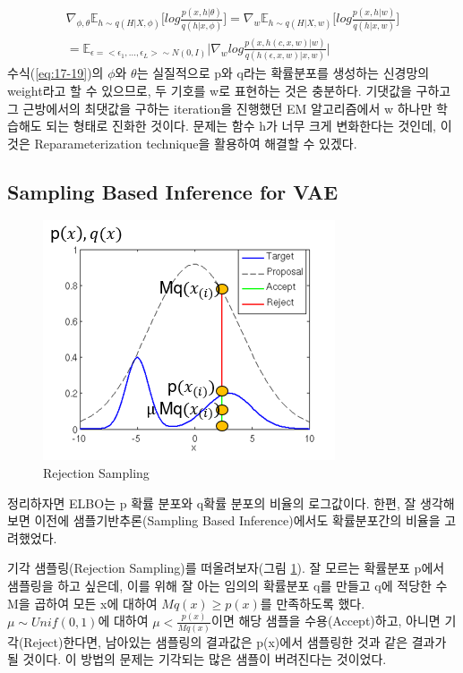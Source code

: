 \documentclass[draft=false]{oblivoir}
\begin{document}
\begin{equation}
	\begin{split}
	\nabla_{\phi,\theta}\mathbb{E}_{h\sim q(H|X,\phi)}\Big[log\frac{p(x,h|\theta)}{q(h|x,\phi)} \Big]
	=\nabla_w \mathbb{E}_{h\sim q(H|X,w)}\Big[log\frac{p(x,h|w)}{q(h|x,w)} \Big] \\
	= \mathbb{E}_{\epsilon=<\epsilon_1,...,\epsilon_L>\sim N(0,I)}\Big| \nabla_wlog\frac{p(x,h(c,x,w)|w)}
	{q(h(\epsilon,x,w)|x,w)} \Big|
	\end{split}
	\label{eq:17-19}
\end{equation}
수식(\ref{eq:17-19})의 $\phi$와 $\theta$는 실질적으로 p와 q라는 확률분포를 생성하는 신경망의 weight라고 할 수 있으므로, 두 기호를 w로 표현하는 것은 충분하다. 기댓값을 구하고 그 근방에서의 최댓값을 구하는 iteration을 진행했던 EM 알고리즘에서 w 하나만 학습해도 되는 형태로 진화한 것이다. 문제는 함수 h가 너무 크게 변화한다는 것인데, 이것은 Reparameterization technique을 활용하여 해결할 수 있겠다.

\subsection{Sampling Based Inference for VAE}

\begin{figure}[ht] \centering
  \includegraphics[scale=1]{fig13.png}
  \caption{Rejection Sampling}
  \label{fig:17-13}
\end{figure}

정리하자면 ELBO는 p 확률 분포와 q확률 분포의 비율의 로그값이다. 한편, 잘 생각해 보면 이전에 샘플기반추론(Sampling Based Inference)에서도 확률분포간의 비율을 고려했었다.

기각 샘플링(Rejection Sampling)를 떠올려보자(그림 \ref{fig:17-13}). 잘 모르는 확률분포 p에서 샘플링을 하고 싶은데, 이를 위해 잘 아는 임의의 확률분포 q를 만들고 q에 적당한 수 M을 곱하여 모든 x에 대하여 $Mq(x)\geq p(x)$를 만족하도록 했다. $\mu \sim Unif(0,1)$에 대하여 $\mu < \frac{p(x)}{Mq(x)}$이면 해당 샘플을 수용(Accept)하고, 아니면 기각(Reject)한다면, 남아있는 샘플링의 결과값은 p(x)에서 샘플링한 것과 같은 결과가 될 것이다. 이 방법의 문제는 기각되는 많은 샘플이 버려진다는 것이었다. 
\end{document}
